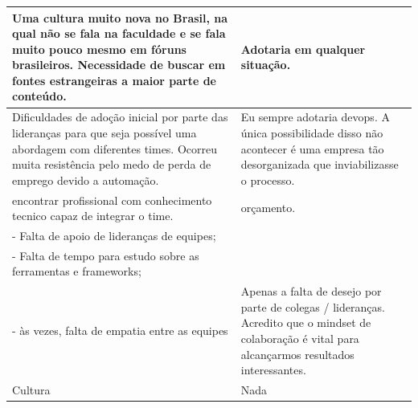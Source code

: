 \documentclass[twoside,english,brazilian]{UNISINOSartigo}
\begin{document}
\begin{table}[h]
\begin{tabularx}{\columnwidth}{XX}
       Uma   cultura muito nova no Brasil, na qual não se fala na faculdade e se fala   muito pouco mesmo em fóruns brasileiros. Necessidade de buscar em fontes   estrangeiras a maior parte de conteúdo.                                                                                                                         &    Adotaria   em qualquer situação.                                                                                                                         \\ \hline
       Dificuldades   de adoção inicial por parte das lideranças para que seja possível uma   abordagem com diferentes times. Ocorreu muita resistência pelo medo de perda   de emprego devido a automação.                                                                                                                        &    Eu   sempre adotaria devops. A única possibilidade disso não acontecer é uma   empresa tão desorganizada que inviabilizasse o processo.                  \\ \hline
       encontrar   profissional com conhecimento tecnico capaz de integrar o time.                                                                                                                                                                                                                                                 &    orçamento.                                                                                                                                               \\ \hline
       - Falta   de apoio de lideranças de equipes;\\     - Falta de tempo para estudo sobre as ferramentas e frameworks;\\     - às vezes, falta de empatia entre as equipes                                                                                                                                                      &    Apenas a   falta de desejo por parte de colegas / lideranças. Acredito que o mindset de   colaboração é vital para alcançarmos resultados interessantes. \\ \hline
       Cultura                                                                                                                                                                                                                                                                                                                     &    Nada                                                                                                                                                     \\ \hline

\end{tabularx}
\end{table}
\end{document}
